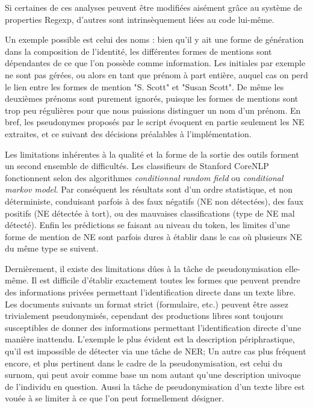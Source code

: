 \documentclass{article}
\begin{document}
Si certaines de ces analyses peuvent être modifiées aisément grâce au système de properties Regexp, d'autres sont intrinsèquement liées au code lui-même.
\par
Un exemple possible est celui des noms : bien qu'il y ait une forme de génération dans la composition de l'identité, les différentes formes de mentions sont dépendantes de ce que l'on possède comme information.
Les initiales par exemple ne sont pas gérées, ou alors en tant que prénom à part entière, auquel cas on perd le lien entre les formes de mention "S. Scott" et "Susan Scott". 
De même les deuxièmes prénoms sont purement ignorés, puisque les formes de mentions sont trop peu régulières pour que nous puissions distinguer un nom d'un prénom.
En bref, les pseudonymes proposés par le script évoquent en partie seulement les NE extraites, et ce suivant des décisions préalables à l'implémentation.
\par
Les limitations inhérentes à la qualité et la forme de la sortie des outils forment un second ensemble de difficultés.
Les classifieurs de Stanford CoreNLP fonctionnent selon des algorithmes \textit{conditionnal random field} ou \textit{conditional markov model}.
Par conséquent les résultats sont d'un ordre statistique, et non déterministe, conduisant parfois à des faux négatifs (NE non détectées), des faux positifs (NE détectée à tort), ou des mauvaises classifications (type de NE mal détecté).
Enfin les prédictions se faisant au niveau du token, les limites d'une forme de mention de NE sont parfois dures à établir dans le cas où plusieurs NE du même type se suivent.
\par
Dernièrement, il existe des limitations dûes à la tâche de pseudonymisation elle-même.
Il est difficile d'établir exactement toutes les formes que peuvent prendre des informations privées permettant l'identification directe dans un texte libre.
Les documents suivants un format strict (formulaire, etc.) peuvent être assez trivialement pseudonymisés, cependant des productions libres sont toujours susceptibles de donner des informations permettant l'identification directe d'une manière inattendu.
L'exemple le plus évident est la description périphrastique, qu'il est impossible de détecter via une tâche de NER;
Un autre cas plus fréquent encore, et plus pertinent dans le cadre de la pseudonymisation, est celui du surnom, qui peut avoir comme base un nom autant qu'une description univoque de l'individu en question.
Aussi la tâche de pseudonymisation d'un texte libre est vouée à se limiter à ce que l'on peut formellement désigner.
\end{document}
